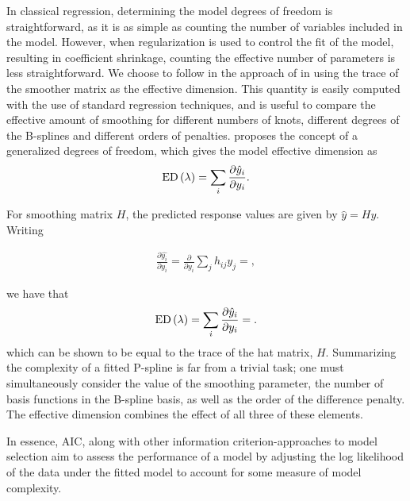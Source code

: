 \documentclass[12pt]{article}
\theoremstyle{definition}
\begin{document}
In classical regression, determining the model degrees of freedom is straightforward, as it is as simple as counting the number of variables included in the model. However, when regularization is used to control the fit of the model, resulting in coefficient shrinkage, counting the effective number of parameters is less straightforward. We choose to follow in the approach of \cite{hastie1986generalized} in using the trace of the smoother matrix as the effective dimension. This quantity is easily computed with the use of standard regression techniques, and is useful to compare the effective amount of smoothing for different numbers of knots, different degrees of the B-splines and different orders of penalties. \cite{ye1998measuring} proposes the concept of a generalized degrees of freedom, which gives the model effective dimension as 
\[
\textup{ED}\left(\lambda\right) = \sum_i \frac{\partial \hat{y}_i}{\partial y_i}.
\]

For smoothing matrix $H$, the predicted response values are given by $\hat{y} = H y$. Writing

\begin{align*}
\frac{\partial \hat{y_i}}{\partial y_i} = \frac{\partial }{\partial y_i} \sum_{j} h_{ij} y_j = ,
\end{align*}

we have that 
\begin{equation}
\textup{ED}\left(\lambda\right) = \sum_i \frac{\partial \hat{y}_i}{\partial y_i} = .
\end{equation}
which can be shown to be equal to the trace of the hat matrix, $H$. Summarizing the complexity of a fitted P-spline is far from a trivial task; one must simultaneously consider the value of the smoothing parameter, the number of basis functions in the B-spline basis, as well as the order of the difference penalty. The effective dimension combines the effect of all three of these elements.


In essence, AIC, along with other information criterion-approaches to model selection aim to assess the performance of a model by adjusting the log likelihood of the data under the fitted model to account for some measure of model complexity. 
\end{document}
